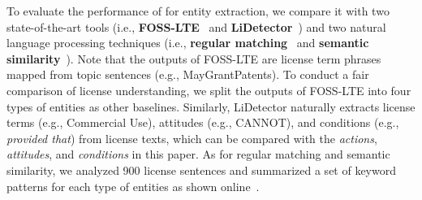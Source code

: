 To evaluate the performance of \tool for entity extraction, we compare it with two state-of-the-art tools (i.e., \textbf{FOSS-LTE}~\cite{APSEC`17-Kapitsaki-termsIdentifying} and \textbf{LiDetector}~\cite{xu2021lidetector}) and two natural language processing techniques (i.e., \textbf{regular matching}~\cite{USENIX`19-Andow-Policylint} and \textbf{semantic similarity}~\cite{goldberg2014word2vec}).
%
Note that the outputs of FOSS-LTE are license term phrases mapped from topic sentences (e.g., MayGrantPatents). To conduct a fair comparison of license understanding, we split the outputs of FOSS-LTE into four types of entities as other baselines. Similarly, LiDetector naturally extracts license terms (e.g., Commercial Use), attitudes (e.g., CANNOT), and conditions (e.g., \textit{provided that}) from license texts, which can be compared with the \textit{actions}, \textit{attitudes}, and \textit{conditions} in this paper. As for regular matching and semantic similarity, we analyzed 900 license sentences and summarized a set of keyword patterns for each type of entities as shown online~\cite{ourwebsite}. 


